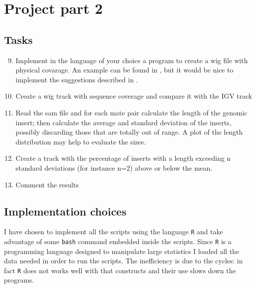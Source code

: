 \newcommand{\scriptusage}{\\Run \texttt{Rscript main.R --help} for more details
on script usage.}

\chapter{Project part 2}\label{chp:part2}
\section{Tasks}
\begin{enumerate}
\setcounter{enumi}{8}

\item Implement in the language of your choice a program to create a wig file
with physical covarage. An example can be found in , but it
would be nice to implement the suggestions described in 
.
\label{itm:2.9}

\item Create a wig track with sequence coverage and compare it with the IGV
track\label{itm:2.10}

\item Read the sam file and for each mate pair calculate the length of the
genomic insert; then calculate the average and standard deviation of the
inserts, possibly discarding those that are totally out of range. A plot of the
length distribution may help to evaluate the sizes.
\label{itm:2.11}

\item Create a track with the percentage of inserts with a length exceeding n
standard deviations (for instance n=2) above or below the mean.
\label{itm:2.12}

\item Comment the results
\label{itm:2.13}
\end{enumerate}
\section{Implementation choices}
I have chosen to implement all the scripts using the language \texttt{R} and
take advantage of some \texttt{bash} command embedded inside the scripts. Since
\texttt{R} is a programming language designed to manipulate large statistics I
loaded all the data needed in order to run the scripts. The inefficiency is due
to the cycles: in fact \texttt{R} does not works well with that constructs and
their use slows down the programs.

